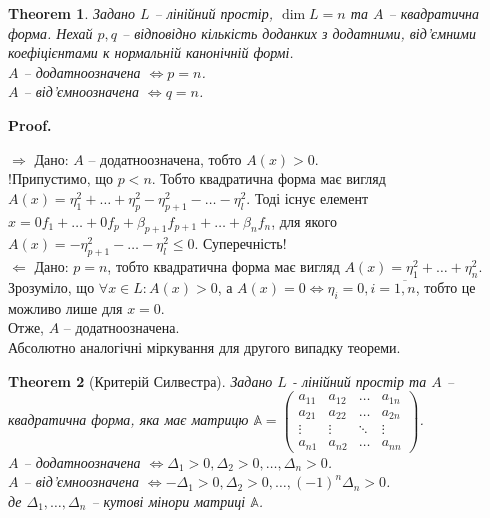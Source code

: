 \documentclass[a4paper, 10pt]{article}
\makeatletter
\def\rightproof{$\boxed{\Rightarrow}$ }
\def\leftproof{$\boxed{\Leftarrow}$ }
\theoremstyle{theoremdd}
\newtheorem{theorem}{Theorem}[subsection]
\renewenvironment{proof}[1][Proof.\\]{\par
\pushQED{\hfill \qed}%
\normalfont \topsep6\p@\@plus6\p@\relax
\trivlist
\item\relax
{\bfseries
#1\@addpunct{.}}\hspace\labelsep\ignorespaces
}{%
\popQED\endtrivlist\@endpefalse
}
\makeatother
\begin{document}
\begin{theorem}
Задано $L$ -- лінійний простір, $\dim L = n$ та $A$ -- квадратична форма. Нехай $p,q$ -- відповідно кількість доданких з додатними, від'ємними коефіцієнтами к нормальній канонічній формі.\\
$A$ -- додатноозначена $\iff p = n$.\\
$A$ -- від'ємноозначена $\iff q = n$.
\end{theorem}

\begin{proof}
\rightproof Дано: $A$ -- додатноозначена, тобто $A(x) > 0$.\\
!Припустимо, що $p < n$. Тобто квадратична форма має вигляд $A(x) = \eta_1^2 + \dots + \eta_p^2 - \eta_{p+1}^2 - \dots - \eta_l^2$. Тоді існує елемент $x = 0f_1 + \dots + 0f_p + \beta_{p+1}f_{p+1} + \dots + \beta_n f_n$, для якого $A(x) = -\eta_{p+1}^2 - \dots - \eta_l^2 \leq 0$. Суперечність!
\bigskip \\
\leftproof Дано: $p = n$, тобто квадратична форма має вигляд $A(x) = \eta_1^2 + \dots + \eta_n^2$. Зрозуміло, що $\forall x \in L: A(x) > 0$, а $A(x) = 0 \iff \eta_i = 0, i = \overline{1,n}$, тобто це можливо лише для $x = 0$. \\
Отже, $A$ -- додатноозначена.
\bigskip \\
Абсолютно аналогічні міркування для другого випадку теореми.
\end{proof}

\begin{theorem}[Критерій Силвестра]
Задано $L$ - лінійний простір та $A$ -- квадратична форма, яка має матрицю $\mathbb{A} = \begin{pmatrix}
a_{11} & a_{12} & \dots & a_{1n} \\
a_{21} & a_{22} & \dots & a_{2n} \\
\vdots & \vdots & \ddots & \vdots \\
a_{n1} & a_{n2} & \dots & a_{nn}
\end{pmatrix}$.\\
$A$ -- додатноозначена $\iff \Delta_1 > 0, \Delta_2 > 0, \dots, \Delta_n > 0$.\\
$A$ -- від'ємноозначена $\iff -\Delta_1 > 0, \Delta_2 > 0, \dots, (-1)^n\Delta_n > 0$.\\
де $\Delta_1,\dots,\Delta_n$ -- кутові мінори матриці $\mathbb{A}$.
\end{theorem}
\end{document}

